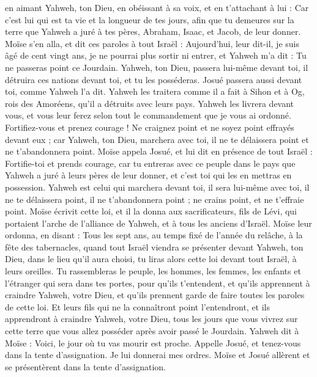 \begin{multicols}{2}
en aimant Yahweh, ton Dieu, en obéissant à sa voix, et en t'attachant à lui : Car c’est lui qui est ta vie et la longueur de tes jours, afin que tu demeures sur la terre que Yahweh a juré à tes pères, Abraham, Isaac, et Jacob, de leur donner.
\VerseOne{}Moïse s'en alla, et dit ces paroles à tout Israël :
Aujourd’hui, leur dit-il, je suis âgé de cent vingt ans, je ne pourrai plus sortir ni entrer, et Yahweh m'a dit : Tu ne passeras point ce Jourdain.
Yahweh, ton Dieu, passera lui-même devant toi, il détruira ces nations devant toi, et tu les posséderas. Josué passera aussi devant toi, comme Yahweh l’a dit.
Yahweh les traitera comme il a fait à Sihon et à Og, rois des Amoréens, qu’il a détruits avec leurs pays.
Yahweh les livrera devant vous, et vous leur ferez selon tout le commandement que je vous ai ordonné.
Fortifiez-vous et prenez courage ! Ne craignez point et ne soyez point effrayés devant eux ; car Yahweh, ton Dieu, marchera avec toi, il ne te délaissera point et ne t'abandonnera point.
Moïse appela Josué, et lui dit en présence de tout Israël : Fortifie-toi et prends courage, car tu entreras avec ce peuple dans le pays que Yahweh a juré à leurs pères de leur donner, et c'est toi qui les en mettras en possession.
Yahweh est celui qui marchera devant toi, il sera lui-même avec toi, il ne te délaissera point, il ne t'abandonnera point ; ne crains point, et ne t’effraie point.
Moïse écrivit cette loi, et il la donna aux sacrificateurs, fils de Lévi, qui portaient l'arche de l'alliance de Yahweh, et à tous les anciens d'Israël.
Moïse leur ordonna, en disant : Tous les sept ans, au temps fixé de l'année du relâche, à la fête des tabernacles,
quand tout Israël viendra se présenter devant Yahweh, ton Dieu, dans le lieu qu'il aura choisi, tu liras alors cette loi devant tout Israël, à leurs oreilles.
Tu rassembleras le peuple, les hommes, les femmes, les enfants et l’étranger qui sera dans tes portes, pour qu'ils t’entendent, et qu'ils apprennent à craindre Yahweh, votre Dieu, et qu'ils prennent garde de faire toutes les paroles de cette loi.
Et leurs fils qui ne la connaîtront point l'entendront, et ils apprendront à craindre Yahweh, votre Dieu, tous les jours que vous vivrez sur cette terre que vous allez posséder après avoir passé le Jourdain.
Yahweh dit à Moïse : Voici, le jour où tu vas mourir est proche. Appelle Josué, et tenez-vous dans la tente d’assignation. Je lui donnerai mes ordres. Moïse et Josué allèrent et se présentèrent dans la tente d’assignation.

\end{multicols}
